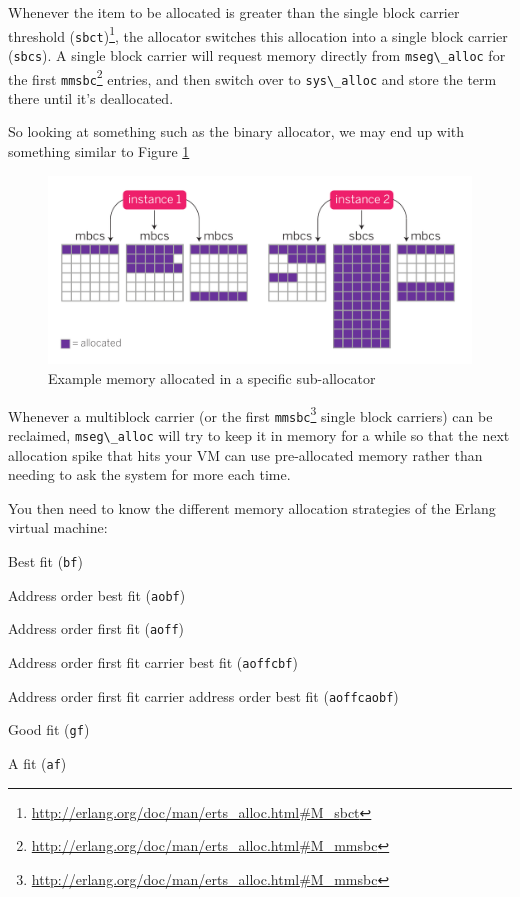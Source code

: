\documentclass[11pt, oneside]{book}   	%
\newcommand{\term}[1]{\Verb`#1`}
\begin{document}
Whenever the item to be allocated is greater than the single block carrier threshold (\term{sbct})\footnote{\href{http://erlang.org/doc/man/erts\_alloc.html\#M\_sbct}{http://erlang.org/doc/man/erts\_alloc.html\#M\_sbct}}, the allocator switches this allocation into a single block carrier (\term{sbcs}). A single block carrier will request memory directly from \term{mseg\_alloc} for the first \term{mmsbc}\footnote{\href{http://erlang.org/doc/man/erts\_alloc.html\#M\_mmsbc}{http://erlang.org/doc/man/erts\_alloc.html\#M\_mmsbc}} entries, and then switch over to \term{sys\_alloc} and store the term there until it's deallocated.

So looking at something such as the binary allocator, we may end up with something similar to Figure \ref{fig:allocation-1-normal}

\begin{figure}
  \includegraphics{allocation-1-normal.pdf}%
  \caption{Example memory allocated in a specific sub-allocator}%
   \label{fig:allocation-1-normal}
\end{figure}
\FloatBarrier

Whenever a multiblock carrier (or the first \term{mmsbc}\footnote{\href{http://erlang.org/doc/man/erts\_alloc.html\#M\_mmsbc}{http://erlang.org/doc/man/erts\_alloc.html\#M\_mmsbc}} single block carriers) can be reclaimed, \term{mseg\_alloc} will try to keep it in memory for a while so that the next allocation spike that hits your VM can use pre-allocated memory rather than needing to ask the system for more each time.

You then need to know the different memory allocation strategies of the Erlang virtual machine:

\begin{enumerate*}
    \item Best fit (\term{bf})
    \item Address order best fit (\term{aobf})
    \item Address order first fit (\term{aoff})
    \item Address order first fit carrier best fit (\term{aoffcbf})
    \item Address order first fit carrier address order best fit (\term{aoffcaobf})
    \item Good fit (\term{gf})
    \item A fit (\term{af})
\end{enumerate*}
\end{document}
